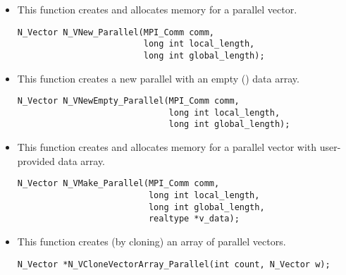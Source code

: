 \begin{itemize}


\item  {}
  
  This function creates and allocates memory for a parallel vector.
 
  

\begin{verbatim}
N_Vector N_VNew_Parallel(MPI_Comm comm, 
                         long int local_length, 
                         long int global_length);
\end{verbatim}
  

\item {}
 
  This function creates a new parallel  with an empty () data array.
 
  

\begin{verbatim}
N_Vector N_VNewEmpty_Parallel(MPI_Comm comm, 
                              long int local_length, 
                              long int global_length);
\end{verbatim}

  

\item {}
  
  This function creates and allocates memory for a parallel vector
  with user-provided data array.
 
  

\begin{verbatim}
N_Vector N_VMake_Parallel(MPI_Comm comm, 
                          long int local_length,
                          long int global_length,
                          realtype *v_data);
\end{verbatim}


\item {}
 
  This function creates (by cloning) an array of  parallel vectors.
 
\begin{verbatim}
N_Vector *N_VCloneVectorArray_Parallel(int count, N_Vector w);
\end{verbatim}


\end{itemize}
